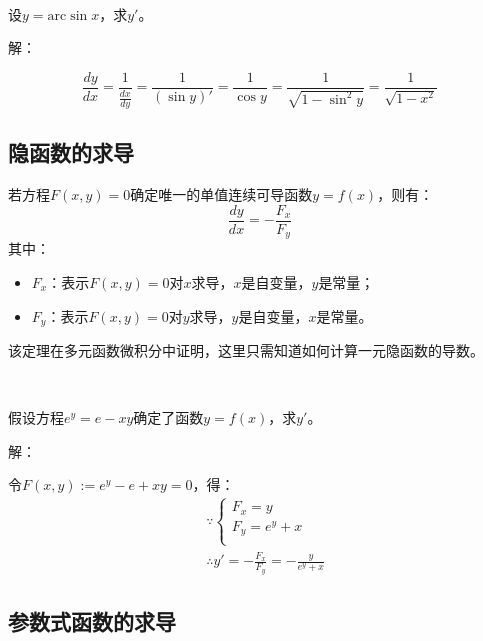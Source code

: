 ~

\begin{example}
设$y=\mathrm{arc}\sin x$，求$y'$。
\end{example}

解：

\[
\frac{dy}{dx}=\frac{1}{\frac{dx}{dy}}=\frac{1}{\left( \sin y \right) '}=\frac{1}{\cos y}=\frac{1}{\sqrt{1-\sin ^2y}}=\frac{1}{\sqrt{1-x^2}}
\]

\subsection{隐函数的求导}

\begin{theorem}[一元隐函数求导定理]
若方程$F\left( x,y \right) =0$确定唯一的单值连续可导函数$y=f\left( x \right) $，则有：
\[
\frac{dy}{dx}=-\frac{F_x}{F_y}
\]
其中：
\begin{itemize}
	\item $F_x$：表示$F\left( x,y \right) =0$对$x$求导，$x$是自变量，$y$是常量；
	\item $F_y$：表示$F\left( x,y \right) =0$对$y$求导，$y$是自变量，$x$是常量。
\end{itemize}
\end{theorem}


\begin{tcolorbox}
该定理在多元函数微积分中证明，这里只需知道如何计算一元隐函数的导数。
\end{tcolorbox}

~

\begin{example}
假设方程$e^y=e-xy$确定了函数$y=f\left( x \right) $，求$y'$。
\end{example}

解：

令$F\left( x,y \right) :=e^y-e+xy=0$，得：
\begin{align*}
&\because \begin{cases}
	F_x=y\\
	F_y=e^y+x\\
\end{cases} \\
&\therefore y'=-\frac{F_x}{F_y}=-\frac{y}{e^y+x}
\end{align*}

\subsection{参数式函数的求导}


